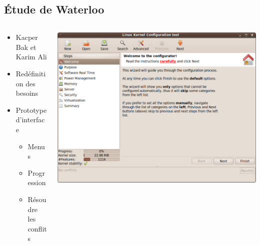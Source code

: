 \documentclass[11pt]{beamer}
\begin{document}
\subsection{Étude de Waterloo}
\begin{frame}
     \begin{columns}
    	\begin{column}{6cm}
            \begin{itemize}
                \setlength{\itemsep}{20pt}
                \item Kacper Bak et Karim Ali
                \item Redéfinition des besoins
                \item Prototype d'interface
                \begin{itemize}
                    \item Menus
                    \item Progression
                    \item Résoudre les conflits
                \end{itemize}
            \end{itemize}
    	\end{column}

    	\begin{column}{6cm}
    		\begin{overprint}
                \includegraphics[scale=0.2]{lkc_config.png}
    		\end{overprint}
    	\end{column}
    \end{columns}
\end{frame}
\end{document}
